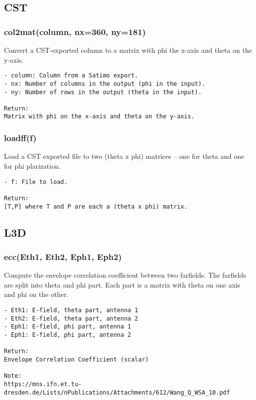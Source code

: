 \clearpage
\subsection{CST}
\subsubsection{col2mat(column, nx=360, ny=181)}
Convert a CST-exported column to a matrix with phi the 
x-axis and theta on the y-axis.

\begin{verbatim}
- column: Column from a Satimo export.
- nx: Number of columns in the output (phi in the input).
- ny: Number of rows in the output (theta in the input).

Return:
Matrix with phi on the x-axis and theta on the y-axis.
\end{verbatim}

\subsubsection{loadff(f)}
Load a CST exported file to two (theta x phi) matrices -- one for theta and
one for phi plarization.

\begin{verbatim}
- f: File to load.

Return:
[T,P] where T and P are each a (theta x phi) matrix.
\end{verbatim}

\clearpage
\subsection{L3D}
\subsubsection{ecc(Eth1, Eth2, Eph1, Eph2)}
Compute the envelope correlation coefficient between two farfields. The
farfields are split into theta and phi part. Each part is a matrix with
theta on one axis and phi on the other.

\begin{verbatim}
- Eth1: E-field, theta part, antenna 1
- Eth2: E-field, theta part, antenna 2
- Eph1: E-field, phi part, antenna 1
- Eph1: E-field, phi part, antenna 2

Return:
Envelope Correlation Coefficient (scalar)

Note:
https://mns.ifn.et.tu-dresden.de/Lists/nPublications/Attachments/612/Wang_Q_WSA_10.pdf
\end{verbatim}

